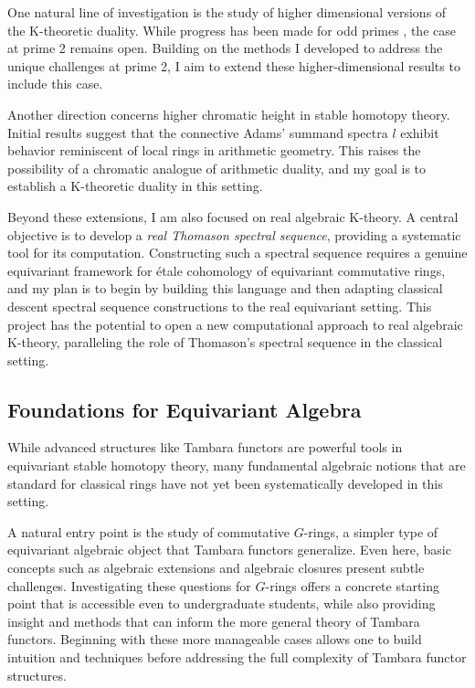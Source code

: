 \documentclass[11pt]{article}
\begin{document}
One natural line of investigation is the study of higher dimensional versions of the K-theoretic duality.
While progress has been made for odd primes \cite{Braunling}, the case at prime 2 remains open.
Building on the methods I developed to address the unique challenges at prime 2, I aim to extend these higher-dimensional results to include this case.

Another direction concerns higher chromatic height in stable homotopy theory.
Initial results \cite{HRW} suggest that the connective Adams' summand spectra $l$ exhibit behavior reminiscent of local rings in arithmetic geometry.
This raises the possibility of a chromatic analogue of arithmetic duality, and my goal is to establish a K-theoretic duality in this setting.

Beyond these extensions, I am also focused on real algebraic K-theory.
A central objective is to develop a {\it real Thomason spectral sequence}, providing a systematic tool for its computation.
Constructing such a spectral sequence requires a genuine equivariant framework for \'etale cohomology of equivariant commutative rings, and my plan is to begin by building this language and then adapting classical descent spectral sequence constructions to the real equivariant setting.
This project has the potential to open a new computational approach to real algebraic K-theory, paralleling the role of Thomason’s spectral sequence in the classical setting.


\subsection*{Foundations for Equivariant Algebra}
While advanced structures like Tambara functors are powerful tools in equivariant stable homotopy theory, many fundamental algebraic notions that are standard for classical rings have not yet been systematically developed in this setting.

A natural entry point is the study of commutative $G$-rings, a simpler type of equivariant algebraic object that Tambara functors generalize.
Even here, basic concepts such as algebraic extensions and algebraic closures present subtle challenges.
Investigating these questions for $G$-rings offers a concrete starting point that is accessible even to undergraduate students, while also providing insight and methods that can inform the more general theory of Tambara functors.
Beginning with these more manageable cases allows one to build intuition and techniques before addressing the full complexity of Tambara functor structures.
\end{document}
